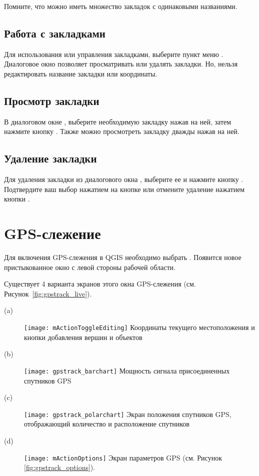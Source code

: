 Помните, что можно иметь множество закладок с одинаковыми названиями.

\subsection{Работа с закладками}
Для использования или управления закладками, выберите пункт меню
 \arrow {}. Диалоговое
окно  позволяет просматривать или удалять
закладки. Но, нельзя редактировать название закладки или координаты.

\subsection{Просмотр закладки}
В диалоговом окне , выберите необходимую
закладку нажав на ней, затем нажмите кнопку . Также
можно просмотреть закладку дважды нажав на ней.

\subsection{Удаление закладки}
Для удаления закладки из диалогового окна ,
выберите ее и нажмите кнопку . Подтвердите ваш выбор
нажатием на кнопке  или отмените удаление нажатием кнопки
.

\section{GPS-слежение}\label{sec:gpstracking}

Для включения GPS-слежения в QGIS необходимо выбрать 
\arrow {}. Появится новое пристыкованное окно
с левой стороны рабочей области.

Существует 4 варианта экранов этого окна GPS-слежения
(см. Рисунок~\ref{fig:gpstrack_live}).

\begin{description}
 \item[(a)] \texttt{[image: mActionToggleEditing]}
 Координаты текущего местоположения и кнопки добавления вершин и объектов
 \item[(b)] \texttt{[image: gpstrack\_barchart]}
 Мощность сигнала присоединенных спутников GPS
 \item[(c)] \texttt{[image: gpstrack\_polarchart]}
 Экран положения спутников GPS, отображающий количество и расположение спутников
 \item[(d)] \texttt{[image: mActionOptions]}
 Экран параметров GPS (см. Рисунок \ref{fig:gpstrack_options}).
\end{description}


